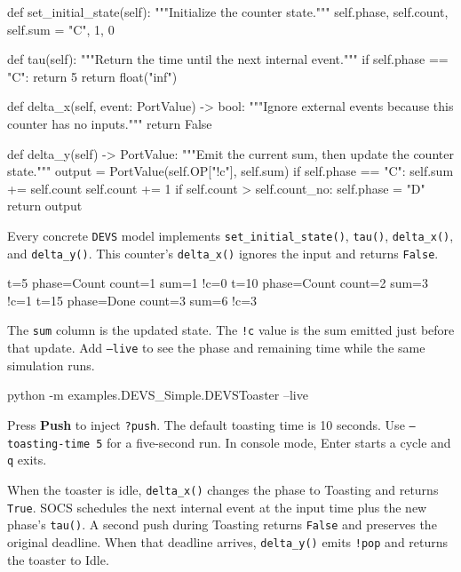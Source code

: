 \documentclass[11pt,a4paper]{article}
\newcommand{\api}[1]{\texttt{#1}}
\newcommand{\chaptermark}[1]{\par\noindent{\LARGE\color{ink}\bfseries #1}\par\smallskip}
\newcommand{\topic}[1]{\par\medskip{\large\color{accent}\bfseries #1}\par}
\begin{document}
\begin{Code}
def set_initial_state(self):
        """Initialize the counter state."""
        self.phase, self.count, self.sum = "C", 1, 0

def tau(self):
        """Return the time until the next internal event."""
        if self.phase == "C":
            return 5
        return float("inf")

def delta_x(self, event: PortValue) -> bool:
    """Ignore external events because this counter has no inputs."""
    return False

def delta_y(self) -> PortValue:
        """Emit the current sum, then update the counter state."""
        output = PortValue(self.OP["!c"], self.sum)
        if self.phase == "C":
            self.sum += self.count
            self.count += 1
            if self.count > self.count_no:
                self.phase = "D"
        return output
\end{Code}
Every concrete \api{DEVS} model implements \api{set\_initial\_state()},
\api{tau()}, \api{delta\_x()}, and \api{delta\_y()}. This counter's
\api{delta\_x()} ignores the input and returns \api{False}.

\begin{Code}
t=5  phase=Count count=1 sum=1 !c=0
t=10 phase=Count count=2 sum=3 !c=1
t=15 phase=Done  count=3 sum=6 !c=3
\end{Code}
The \api{sum} column is the updated state. The \api{!c} value is the
sum emitted just before that update. Add \api{--live} to see the phase
and remaining time while the same simulation runs.

\newpage
\chaptermark{2.1 \enspace DEVS, continued}
\topic{2.1.2 \enspace DEVSToaster}
\begin{Code}
python -m examples.DEVS_Simple.DEVSToaster --live
\end{Code}
Press \textbf{Push} to inject \api{?push}. The default toasting time
is 10 seconds. Use \api{--toasting-time 5} for a five-second run. In
console mode, Enter starts a cycle and \api{q} exits.

When the toaster is idle, \api{delta\_x()} changes the phase to
Toasting and returns \api{True}. SOCS schedules the next internal
event at the input time plus the new phase's \api{tau()}. A second
push during Toasting returns \api{False} and preserves the original
deadline. When that deadline arrives, \api{delta\_y()} emits
\api{!pop} and returns the toaster to Idle.
\end{document}
